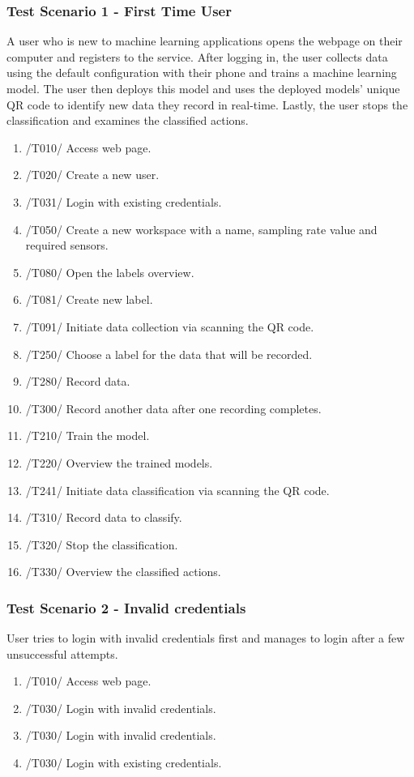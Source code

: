 \subsubsection{Test Scenario 1 - First Time User}
A user who is new to machine learning applications opens the webpage on their computer and registers to the service. After logging in, the user collects data using the default configuration with their phone and trains a machine learning model. The user then deploys this model and uses the deployed models' unique QR code to identify new data they record in real-time. Lastly, the user stops the classification and examines the classified actions.
\begin{enumerate}
    \item /T010/ Access web page.
    \item /T020/ Create a new user.
    \item /T031/ Login with existing credentials.
    \item /T050/ Create a new workspace with a name, sampling rate value and required sensors.
    \item /T080/ Open the labels overview.
    \item /T081/ Create new label.
    \item /T091/ Initiate data collection via scanning the QR code.
    \item /T250/ Choose a label for the data that will be recorded.
    \item /T280/ Record data.
    \item /T300/ Record another data after one recording completes.
    \item /T210/ Train the model.
    \item /T220/ Overview the trained models.
    \item /T241/ Initiate data classification via scanning the QR code.
    \item /T310/ Record data to classify.
    \item /T320/ Stop the classification.
    \item /T330/ Overview the classified actions.
\end{enumerate}
\subsubsection{Test Scenario 2 - Invalid credentials}
User tries to login with invalid credentials first and manages to login after a few unsuccessful attempts.
\begin{enumerate}
    \item /T010/ Access web page.
    \item /T030/ Login with invalid credentials.
    \item /T030/ Login with invalid credentials.
    \item /T030/ Login with existing credentials.
\end{enumerate}
